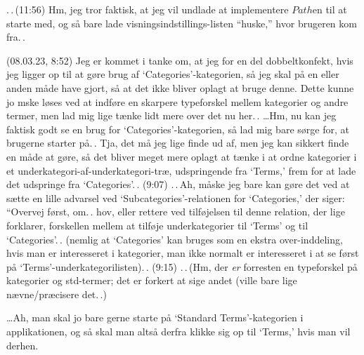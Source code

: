 \documentclass{report}
\begin{document}
.\,.\,(11:56) Hm, jeg tror faktisk, at jeg vil undlade at implementere $Path$en til at starte med, og så bare lade visningsindstillings-listen ``huske,'' hvor brugeren kom fra.\,. 

(08.03.23, 8:52) Jeg er kommet i tanke om, at jeg for en del dobbeltkonfekt, hvis jeg ligger op til at gøre brug af `Categories'-kategorien, så jeg skal på en eller anden måde have gjort, så at det ikke bliver oplagt at bruge denne. Dette kunne jo mske løses ved at indføre en skarpere typeforskel mellem kategorier og andre termer, men lad mig lige tænke lidt mere over det nu her.\,. 
\ldots Hm, nu kan jeg faktisk godt se en brug for `Categories'-kategorien, så lad mig bare sørge for, at brugerne starter på.\,. Tja, det må jeg lige finde ud af, men jeg kan sikkert finde en måde at gøre, så det bliver meget mere oplagt at tænke i at ordne kategorier i et underkategori-af-underkategori-træ, udspringende fra `Terms,' frem for at lade det udspringe fra `Categories'.\,. (9:07) .\,.\,Ah, måske jeg bare kan gøre det ved at sætte en lille advarsel ved `Subcategories'-relationen for `Categories,' der siger: ``Overvej først, om.\,. hov, eller rettere ved tilføjelsen til denne relation, der lige forklarer, forskellen mellem at tilføje underkategorier til `Terms' og til `Categories'.\,. (nemlig at `Categories' kan bruges som en ekstra over-inddeling, hvis man er interesseret i kategorier, man ikke normalt er interesseret i at se først på `Terms'-underkategorilisten).\,. (9:15) .\,.\,(Hm, der \emph{er} forresten en typeforskel på kategorier og std-termer; det er forkert at sige andet (ville bare lige nævne/præcisere det.\,.)

\ldots Ah, man skal jo bare gerne starte på `Standard Terms'-kategorien i applikationen, og så skal man altså derfra klikke sig op til `Terms,' hvis man vil derhen.
\end{document}

